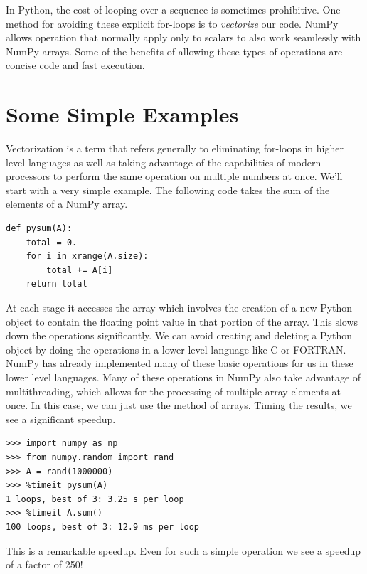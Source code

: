 \label{lab:Python_Vectorization}

In Python, the cost of looping over a sequence is sometimes prohibitive.
One method for avoiding these explicit for-loops is to \emph{vectorize} our code.
NumPy allows operation that normally apply only to scalars to also work seamlessly with NumPy arrays.
Some of the benefits of allowing these types of operations are concise code and fast execution.

\section*{Some Simple Examples}

Vectorization is a term that refers generally to eliminating for-loops in higher level languages as well as taking advantage of the capabilities of modern processors to perform the same operation on multiple numbers at once.
We'll start with a very simple example.
The following code takes the sum of the elements of a NumPy array.
\begin{lstlisting}
def pysum(A):
    total = 0.
    for i in xrange(A.size):
        total += A[i]
    return total
\end{lstlisting}
At each stage it accesses the array which involves the creation of a new Python object to contain the floating point value in that portion of the array.
This slows down the operations significantly.
We can avoid creating and deleting a Python object by doing the operations in a lower level language like C or FORTRAN.
NumPy has already implemented many of these basic operations for us in these lower level languages.
Many of these operations in NumPy also take advantage of multithreading, which allows for the processing of multiple array elements at once.
In this case, we can just use the  method of arrays.
Timing the results, we see a significant speedup.
\begin{lstlisting}
>>> import numpy as np
>>> from numpy.random import rand
>>> A = rand(1000000)
>>> %timeit pysum(A)
1 loops, best of 3: 3.25 s per loop
>>> %timeit A.sum()
100 loops, best of 3: 12.9 ms per loop
\end{lstlisting}
This is a remarkable speedup.
Even for such a simple operation we see a speedup of a factor of 250!

